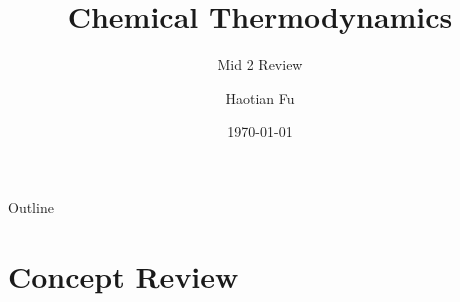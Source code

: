 \documentclass[12pt,compress]{beamer}
\title{Chemical Thermodynamics}
\subtitle{Mid 2 Review}
\author{Haotian Fu}
\institute{University of Michigan--Shanghai Jiao Tong University Joint Institute}
\date{\today}
\begin{document}


\frame{\titlepage}

\section[Outline]{}
\begin{frame}{Outline}
    \tableofcontents
\end{frame}


\section{Concept Review}
\end{document}
